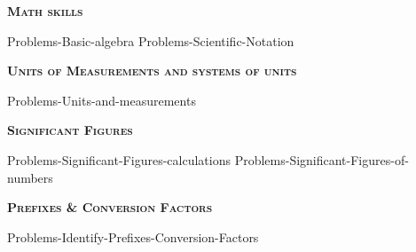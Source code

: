 \documentclass[main.tex]{subfiles}
\newcommand\chapterlabel{Ch-measurements}
\begin{document}
\newpage
\setdoublesep{0.35700 em}  %
\setatomsep{1.78500 em}    %
\setbondoffset{0.18265 em} %
\renewcommand{\bondwidth}{0.06642 em} %
\setbondstyle{line width = \bondwidth}
\fancyhfoffset[E,O]{0pt}
\setlength{\columnsep}{30pt}
\begin{conclusion}
\end{conclusion}
\begin{multicols*}{2}\setcounter{numA}{1}
 
 


{\raggedright\textsc{\textbf{Math skills }}\par}
{Problems-Basic-algebra}
{Problems-Scientific-Notation}

{\raggedright\textsc{\textbf{Units of Measurements and systems of units }}\par}
{Problems-Units-and-measurements}

{\raggedright\textsc{\textbf{Significant Figures }}\par}
\iftoggle{UneditedText}{ %
\begin{cornerbox}[northeastsouthwest,allcolors=yellow!20!red,allrules=2pt]
{Problems-Significant-Exact-and-measured-numbers}
\end{cornerbox}}{}
{Problems-Significant-Figures-calculations}
{Problems-Significant-Figures-of-numbers}
\iftoggle{UneditedText}{ %
\begin{cornerbox}[northeastsouthwest,allcolors=yellow!20!red,allrules=2pt]
{Problems-Significant-Rounding}
\end{cornerbox}}{}


{\raggedright\textsc{\textbf{Prefixes \& Conversion Factors }}\par}
{Problems-Identify-Prefixes-Conversion-Factors}





\end{multicols*}
\end{document}
